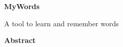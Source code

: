 \thispagestyle{plain}
\begin{center}
    \Large
    \textbf{MyWords}
    
    \vspace{0.4cm}
    \large
    A tool to learn and remember words
    
    \vspace{0.4cm}
    
    \vspace{0.9cm}
    \textbf{Abstract}
\end{center}
